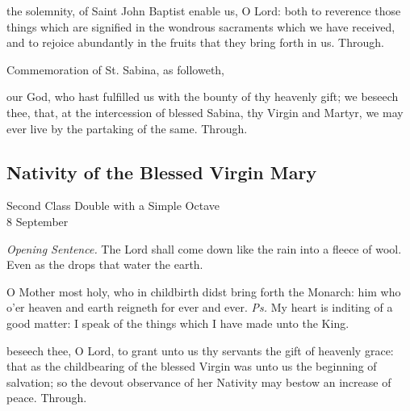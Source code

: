\postcommunion
{} the solemnity, of Saint John Baptist enable us, O Lord: both to reverence those things which are signified in the wondrous sacraments which we have received, and to rejoice abundantly in the fruits that they bring forth in us. Through.

\begin{rubric}
	 Commemoration of St. Sabina, as followeth,
\end{rubric}
 our God, who hast fulfilled us with the bounty of thy heavenly gift; we beseech thee, that, at the intercession of blessed Sabina, thy Virgin and Martyr, we may ever live by the partaking of the same. Through.


\subsection{Nativity of the Blessed Virgin Mary}
\begin{inhead}
    {Second Class Double with a Simple Octave\\
8 September}
\end{inhead}
\par\noindent
\textit{Opening Sentence.} The Lord shall come down like the rain into a fleece of wool. Even as the drops that water the earth.

\introit
{} O Mother most holy, who in childbirth didst bring forth the Monarch: him who o'er heaven and earth reigneth for ever and ever. \textit{Ps.} My heart is inditing of a good matter: I speak of the things which I have made unto the King.

\collect
{} beseech thee, O Lord, to grant unto us thy servants the gift of heavenly grace: that as the childbearing of the blessed Virgin was unto us the beginning of salvation; so the devout observance of her Nativity may bestow an increase of peace. Through.

